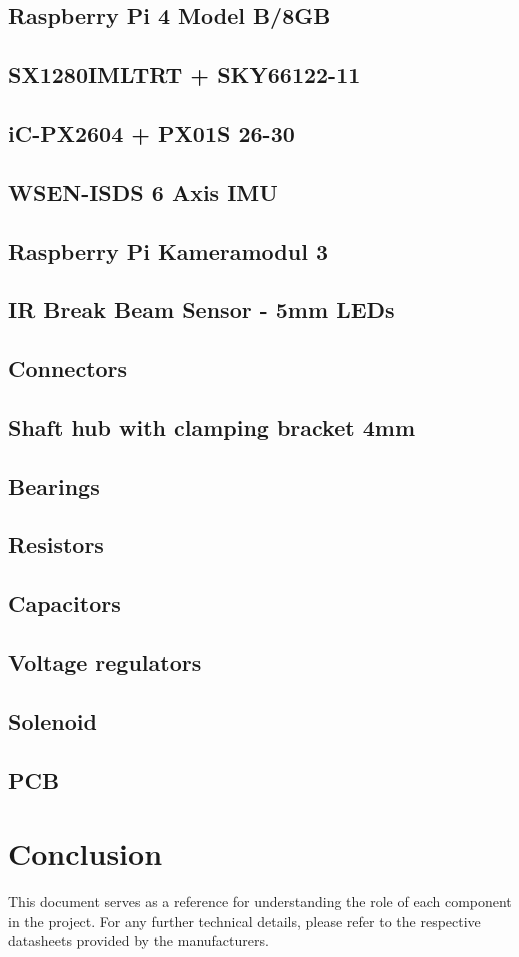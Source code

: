 \documentclass[a4paper,12pt]{article}
\begin{document}
\subsection*{Raspberry Pi 4 Model B/8GB}
\subsection*{SX1280IMLTRT + SKY66122-11}
\subsection*{iC-PX2604 + PX01S 26-30}
\subsection*{WSEN-ISDS 6 Axis IMU}
\subsection*{Raspberry Pi Kameramodul 3}
\subsection*{IR Break Beam Sensor - 5mm LEDs}
\subsection*{Connectors}
\subsection*{Shaft hub with clamping bracket 4mm}
\subsection*{Bearings}
\subsection*{Resistors}
\subsection*{Capacitors}
\subsection*{Voltage regulators}
\subsection*{Solenoid}
\subsection*{PCB}
\section*{Conclusion}
This document serves as a reference for understanding the role of each component in the project. For any further technical details, please refer to the respective datasheets provided by the manufacturers.
\end{document}
